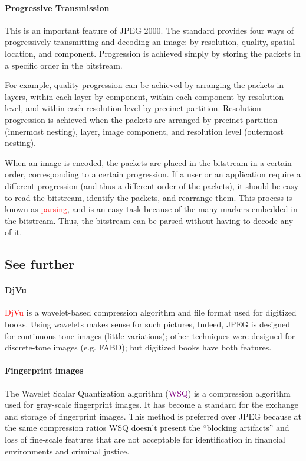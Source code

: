 \documentclass[a4paper, 11pt, openany]{book}
\numberwithin{equation}{section}
\theoremstyle{plain}
\theoremstyle{definition}
\newcommand{\Important}[1]{\textcolor{red}{#1}}
\newcommand{\Define}[1]{\textcolor{purple}{#1}}
\begin{document}
\paragraph{Progressive Transmission}
This is an important feature of JPEG 2000. The
standard provides four ways of progressively transmitting and decoding an image: by
resolution, quality, spatial location, and component. Progression is achieved simply
by storing the packets in a specific order in the bitstream. 

For example, quality  progression can be achieved by arranging the packets in layers, within each layer by component, within each component by resolution level, and within each resolution level by precinct partition. Resolution progression is achieved when the packets are arranged by precinct partition (innermost nesting), layer, image component, and resolution level (outermost nesting). 

When an image is encoded, the packets are placed in the bitstream in a certain order, corresponding to a certain progression. If a user or an application require a different progression (and thus a different order of the packets), it should be easy to read the bitstream, identify the packets, and rearrange them. This process is known as \Important{parsing}, and is an easy task because of the many markers embedded in the bitstream. Thus, the bitstream can be parsed without having to decode
any of it.




\subsection{See further}

\paragraph{DjVu} 
\Important{DjVu} is a wavelet-based compression algorithm and file format used for digitized books. Using wavelets makes sense for such pictures, Indeed, JPEG is designed for continuous-tone images (little variations); other techniques were designed for discrete-tone images (e.g. FABD); but digitized books have both features.

\paragraph{Fingerprint images} 
The Wavelet Scalar Quantization algorithm (\Define{WSQ}) is a compression algorithm used for gray-scale fingerprint images. It has become a standard for the exchange and storage of fingerprint images. This method is preferred over JPEG because at the same compression ratios WSQ doesn't present the ``blocking artifacts'' and loss of fine-scale features that are not acceptable for identification in financial environments and criminal justice.
\end{document}
